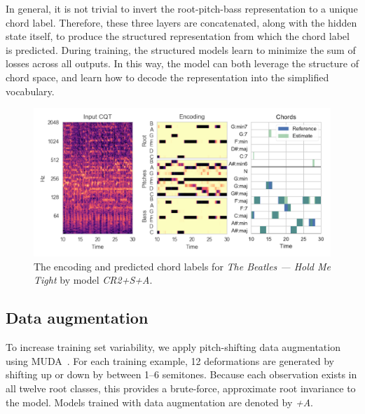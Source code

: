 \documentclass{article}
\begin{document}
In general, it is not trivial to invert the root-pitch-bass representation to a unique chord label.
Therefore, these three layers are concatenated, along with the hidden state itself, to produce the structured representation from which the chord label is predicted.
During training, the structured models learn to minimize the sum of losses across all outputs.
In this way, the model can both leverage the structure of chord space, and learn how to decode the representation into the simplified vocabulary.
\begin{figure}
    \centering
    \includegraphics[width=\columnwidth]{encviz}
    \caption{The encoding and predicted chord labels for \emph{The Beatles --- Hold Me Tight} by model \emph{CR2+S+A}.\label{fig:encviz}}
\end{figure}



\subsection{Data augmentation}
\label{sec:muda}
To increase training set variability, we apply pitch-shifting data augmentation using MUDA~\cite{mcfee2015software}.
For each training example, 12 deformations are generated by shifting up or down by between 1--6 semitones.
Because each observation exists in all twelve root classes, this provides a brute-force, approximate root invariance to the model.
Models trained with data augmentation are denoted by \emph{+A}.
\end{document}
